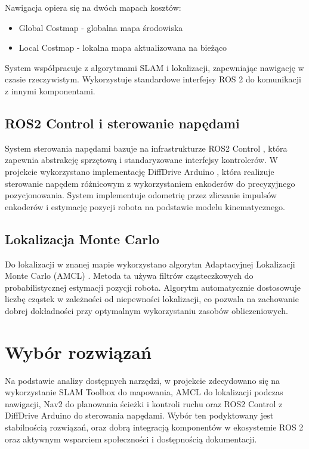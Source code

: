 \documentclass[a4paper,twoside,12pt]{book}
\begin{document}
Nawigacja opiera się na dwóch mapach kosztów:
\begin{itemize}
\item Global Costmap - globalna mapa środowiska
\item Local Costmap - lokalna mapa aktualizowana na bieżąco
\end{itemize}

System współpracuje z algorytmami SLAM i lokalizacji, zapewniając nawigację w czasie rzeczywistym. Wykorzystuje standardowe interfejsy ROS 2 do komunikacji z innymi komponentami.

\subsection{ROS2 Control i sterowanie napędami}
System sterowania napędami bazuje na infrastrukturze ROS2 Control \cite{bib:ros2control}, która zapewnia abstrakcję sprzętową i standaryzowane interfejsy kontrolerów. W projekcie wykorzystano implementację DiffDrive Arduino \cite{bib:diffdrive}, która realizuje sterowanie napędem różnicowym z wykorzystaniem enkoderów do precyzyjnego pozycjonowania. System implementuje odometrię przez zliczanie impulsów enkoderów i estymację pozycji robota na podstawie modelu kinematycznego.

\subsection{Lokalizacja Monte Carlo}
Do lokalizacji w znanej mapie wykorzystano algorytm Adaptacyjnej Lokalizacji Monte Carlo (AMCL) \cite{bib:amcl}. Metoda ta używa filtrów cząsteczkowych do probabilistycznej estymacji pozycji robota. Algorytm automatycznie dostosowuje liczbę cząstek w zależności od niepewności lokalizacji, co pozwala na zachowanie dobrej dokładności przy optymalnym wykorzystaniu zasobów obliczeniowych.

\section{Wybór rozwiązań}
Na podstawie analizy dostępnych narzędzi, w projekcie zdecydowano się na wykorzystanie SLAM Toolbox do mapowania, AMCL do lokalizacji podczas nawigacji, Nav2 do planowania ścieżki i kontroli ruchu oraz ROS2 Control z DiffDrive Arduino do sterowania napędami. Wybór ten podyktowany jest stabilnością rozwiązań, oraz dobrą integracją komponentów w ekosystemie ROS 2 oraz aktywnym wsparciem społeczności i dostępnością dokumentacji.
\end{document}

